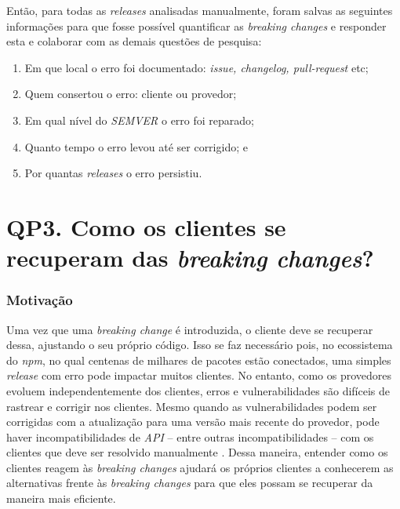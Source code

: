 Então, para todas as \textit{releases} analisadas manualmente, foram salvas as seguintes informações para que fosse possível quantificar as \textit{breaking changes} e responder esta e colaborar com as demais questões de pesquisa:

\begin{enumerate}
    \item Em que local o erro foi documentado: \textit{issue, changelog, pull-request} etc;
    \item Quem consertou o erro: cliente ou provedor;
    \item Em qual nível do \textit{SEMVER} o erro foi reparado;
    \item Quanto tempo o erro levou até ser corrigido; e
    \item Por quantas \textit{releases} o erro persistiu.
\end{enumerate}{}


\section{QP3. Como os clientes se recuperam das \textit{breaking changes}?}
\label{sec:qp3}

\subsubsection{Motivação}
\label{sec:qp3:motivation}

Uma vez que uma \textit{breaking change} é introduzida, o cliente deve se recuperar dessa, ajustando o seu próprio código. Isso se faz necessário pois, no ecossistema do  \textit{npm}, no qual centenas de milhares de pacotes estão conectados, uma simples \textit{release} com erro pode impactar muitos clientes. No entanto, como os provedores evoluem independentemente dos clientes, erros e vulnerabilidades são difíceis de rastrear e corrigir nos clientes. Mesmo quando as vulnerabilidades podem ser corrigidas com a atualização para uma versão mais recente do provedor, pode haver incompatibilidades de \textit{API} -- entre outras incompatibilidades -- com os clientes que deve ser resolvido manualmente \cite{Foo:2018:ESC:3236024.3275535}. Dessa maneira, entender como os clientes reagem às \textit{breaking changes} ajudará os próprios clientes a conhecerem as alternativas frente às \textit{breaking changes} para que eles possam se recuperar da maneira mais eficiente.

